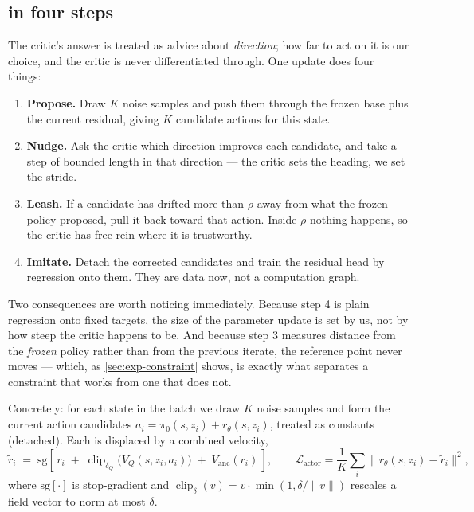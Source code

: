 \subsection{\method{} in four steps}
\label{sec:field-update}

The critic's answer is treated as advice about \emph{direction}; how far to
act on it is our choice, and the critic is never differentiated through. One
update does four things:

\begin{enumerate}
  \item \textbf{Propose.} Draw $K$ noise samples and push them through the
  frozen base plus the current residual, giving $K$ candidate actions for this
  state.
  \item \textbf{Nudge.} Ask the critic which direction improves each
  candidate, and take a step of bounded length in that direction --- the
  critic sets the heading, we set the stride.
  \item \textbf{Leash.} If a candidate has drifted more than $\rho$ away from
  what the frozen policy proposed, pull it back toward that action. Inside
  $\rho$ nothing happens, so the critic has free rein where it is trustworthy.
  \item \textbf{Imitate.} Detach the corrected candidates and train the
  residual head by regression onto them. They are data now, not a computation
  graph.
\end{enumerate}

Two consequences are worth noticing immediately. Because step 4 is plain
regression onto fixed targets, the size of the parameter update is set by us,
not by how steep the critic happens to be. And because step 3 measures distance
from the \emph{frozen} policy rather than from the previous iterate, the
reference point never moves --- which, as \cref{sec:exp-constraint} shows, is
exactly what separates a constraint that works from one that does not.

Concretely: for each state in the batch we draw $K$ noise samples and form the
current action candidates $a_i = \pi_0(s, z_i) + r_\theta(s, z_i)$, treated as
constants (detached). Each is displaced by a combined velocity,
\begin{equation}
  \tilde{r}_i \;=\; \mathrm{sg}\!\left[\, r_i
     \;+\; \operatorname{clip}_{\delta_Q}\!\big(V_Q(s, z_i, a_i)\big)
     \;+\; V_{\mathrm{anc}}(r_i) \,\right],
  \qquad
  \mathcal{L}_{\mathrm{actor}}
  = \frac{1}{K}\sum_i \big\| r_\theta(s, z_i) - \tilde{r}_i \big\|^2 ,
  \label{eq:update}
\end{equation}
where $\mathrm{sg}[\cdot]$ is stop-gradient and
$\operatorname{clip}_{\delta}(v) = v \cdot \min(1, \delta / \|v\|)$
rescales a field vector to norm at most $\delta$.

